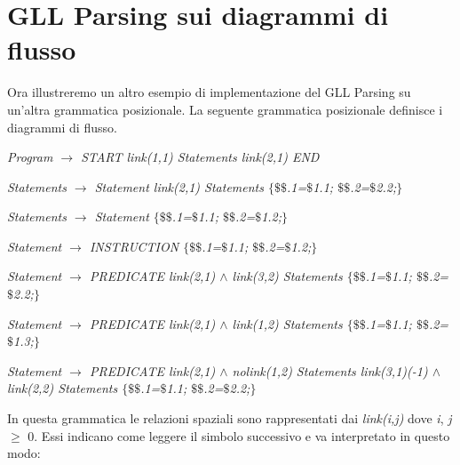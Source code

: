 \section{GLL Parsing sui diagrammi di flusso}
Ora illustreremo un altro esempio di implementazione del GLL Parsing su un'altra grammatica posizionale. La seguente grammatica posizionale definisce i diagrammi di flusso.\par
\begin{center}
	\textit{Program $\to$ START link(1,1) Statements link(2,1) END} \par
	\textit{Statements $\to$ Statement link(2,1) Statements $\{$$\$\$$.1=$\$$1.1; $\$\$$.2=$\$$2.2;$\}$} \par
	\textit{Statements $\to$ Statement $\{$$\$\$$.1=$\$$1.1; $\$\$$.2=$\$$1.2;$\}$}\par
	\textit{Statement $\to$ INSTRUCTION $\{$$\$\$$.1=$\$$1.1; $\$\$$.2=$\$$1.2;$\}$}\par
	\textit{Statement $\to$ PREDICATE link(2,1) $\wedge$ link(3,2) Statements $\{$$\$\$$.1=$\$$1.1; $\$\$$.2=$\$$2.2;$\}$}\par
	\textit{Statement $\to$ PREDICATE  link(2,1) $\wedge$ link(1,2) Statements $\{$$\$\$$.1=$\$$1.1; $\$\$$.2=$\$$1.3;$\}$}\par
	\textit{Statement $\to$ PREDICATE  link(2,1) $\wedge$ nolink(1,2) Statements link(3,1)(-1) $\wedge$ link(2,2) Statements $\{$$\$\$$.1=$\$$1.1; $\$\$$.2=$\$$2.2;$\}$}\par
\end{center}
In questa grammatica le relazioni spaziali sono rappresentati dai \textit{link(i,j)} dove \textit{i}, \textit{j} $\geq$ 0. Essi indicano come leggere il simbolo successivo e va interpretato in questo modo: 
